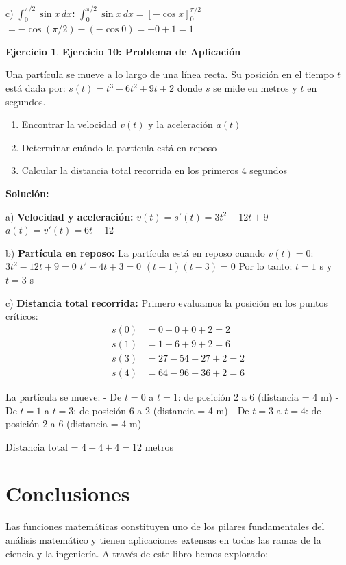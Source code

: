 \documentclass[12pt, a4paper, oneside]{book}
\theoremstyle{definition}
\newtheorem{ejercicio}{Ejercicio}[chapter]
\begin{document}
c) \textbf{$\int_0^{\pi/2} \sin x \, dx$:}
$\int_0^{\pi/2} \sin x \, dx = [-\cos x]_0^{\pi/2}$
$= -\cos(\pi/2) - (-\cos 0) = -0 + 1 = 1$

\begin{ejercicio}
\textbf{Ejercicio 10: Problema de Aplicación}

Una partícula se mueve a lo largo de una línea recta. Su posición en el tiempo $t$ está dada por:
$s(t) = t^3 - 6t^2 + 9t + 2$
donde $s$ se mide en metros y $t$ en segundos.

\begin{enumerate}[label=\alph*)]
    \item Encontrar la velocidad $v(t)$ y la aceleración $a(t)$
    \item Determinar cuándo la partícula está en reposo
    \item Calcular la distancia total recorrida en los primeros 4 segundos
\end{enumerate}
\end{ejercicio}

\textbf{Solución:}

a) \textbf{Velocidad y aceleración:}
$v(t) = s'(t) = 3t^2 - 12t + 9$
$a(t) = v'(t) = 6t - 12$

b) \textbf{Partícula en reposo:}
La partícula está en reposo cuando $v(t) = 0$:
$3t^2 - 12t + 9 = 0$
$t^2 - 4t + 3 = 0$
$(t - 1)(t - 3) = 0$
Por lo tanto: $t = 1$ s y $t = 3$ s

c) \textbf{Distancia total recorrida:}
Primero evaluamos la posición en los puntos críticos:
\begin{align}
s(0) &= 0 - 0 + 0 + 2 = 2 \\
s(1) &= 1 - 6 + 9 + 2 = 6 \\
s(3) &= 27 - 54 + 27 + 2 = 2 \\
s(4) &= 64 - 96 + 36 + 2 = 6
\end{align}

La partícula se mueve:
- De $t = 0$ a $t = 1$: de posición 2 a 6 (distancia = 4 m)
- De $t = 1$ a $t = 3$: de posición 6 a 2 (distancia = 4 m)
- De $t = 3$ a $t = 4$: de posición 2 a 6 (distancia = 4 m)

Distancia total = $4 + 4 + 4 = 12$ metros

\section{Conclusiones}

Las funciones matemáticas constituyen uno de los pilares fundamentales del análisis matemático y tienen aplicaciones extensas en todas las ramas de la ciencia y la ingeniería. A través de este libro hemos explorado:
\end{document}
